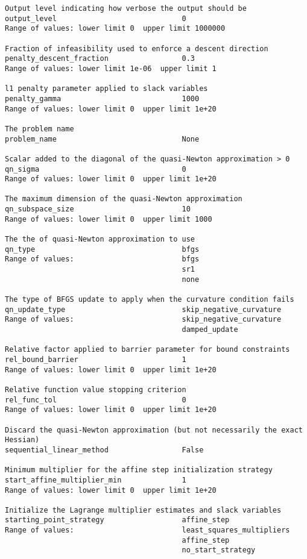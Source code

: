 \documentclass[12pt]{article}
\begin{document}
{\begin{verbatim}
Output level indicating how verbose the output should be
output_level                             0
Range of values: lower limit 0  upper limit 1000000

Fraction of infeasibility used to enforce a descent direction
penalty_descent_fraction                 0.3
Range of values: lower limit 1e-06  upper limit 1

l1 penalty parameter applied to slack variables
penalty_gamma                            1000
Range of values: lower limit 0  upper limit 1e+20

The problem name
problem_name                             None

Scalar added to the diagonal of the quasi-Newton approximation > 0
qn_sigma                                 0
Range of values: lower limit 0  upper limit 1e+20

The maximum dimension of the quasi-Newton approximation
qn_subspace_size                         10
Range of values: lower limit 0  upper limit 1000

The the of quasi-Newton approximation to use
qn_type                                  bfgs
Range of values:                         bfgs
                                         sr1
                                         none

The type of BFGS update to apply when the curvature condition fails
qn_update_type                           skip_negative_curvature
Range of values:                         skip_negative_curvature
                                         damped_update

Relative factor applied to barrier parameter for bound constraints
rel_bound_barrier                        1
Range of values: lower limit 0  upper limit 1e+20

Relative function value stopping criterion
rel_func_tol                             0
Range of values: lower limit 0  upper limit 1e+20

Discard the quasi-Newton approximation (but not necessarily the exact Hessian)
sequential_linear_method                 False

Minimum multiplier for the affine step initialization strategy
start_affine_multiplier_min              1
Range of values: lower limit 0  upper limit 1e+20

Initialize the Lagrange multiplier estimates and slack variables
starting_point_strategy                  affine_step
Range of values:                         least_squares_multipliers
                                         affine_step
                                         no_start_strategy


\end{verbatim}}
\end{document}
